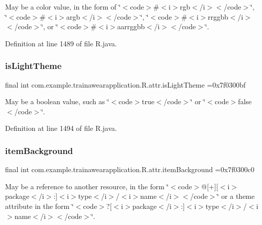May be a color value, in the form of \char`\"{}$<$code$>$\#$<$i$>$rgb$<$/i$>$$<$/code$>$\char`\"{}, \char`\"{}$<$code$>$\#$<$i$>$argb$<$/i$>$$<$/code$>$\char`\"{}, \char`\"{}$<$code$>$\#$<$i$>$rrggbb$<$/i$>$$<$/code$>$\char`\"{}, or \char`\"{}$<$code$>$\#$<$i$>$aarrggbb$<$/i$>$$<$/code$>$\char`\"{}. 

Definition at line 1489 of file R.\+java.

\mbox{\label{classcom_1_1example_1_1trainawearapplication_1_1_r_1_1attr_a0022e702c6ffefa6c69963eed311437e}} 
\subsubsection{\texorpdfstring{isLightTheme}{isLightTheme}}
{\footnotesize\ttfamily final int com.\+example.\+trainawearapplication.\+R.\+attr.\+is\+Light\+Theme =0x7f0300bf\hspace{0.3cm}{\ttfamily [static]}}

May be a boolean value, such as \char`\"{}$<$code$>$true$<$/code$>$\char`\"{} or \char`\"{}$<$code$>$false$<$/code$>$\char`\"{}. 

Definition at line 1494 of file R.\+java.

\mbox{\label{classcom_1_1example_1_1trainawearapplication_1_1_r_1_1attr_ab1cb963f996615386ef9951786344a9b}} 
\subsubsection{\texorpdfstring{itemBackground}{itemBackground}}
{\footnotesize\ttfamily final int com.\+example.\+trainawearapplication.\+R.\+attr.\+item\+Background =0x7f0300c0\hspace{0.3cm}{\ttfamily [static]}}

May be a reference to another resource, in the form \char`\"{}$<$code$>$@\mbox{[}+\mbox{]}\mbox{[}$<$i$>$package$<$/i$>$\+:\mbox{]}$<$i$>$type$<$/i$>$/$<$i$>$name$<$/i$>$$<$/code$>$\char`\"{} or a theme attribute in the form \char`\"{}$<$code$>$?\mbox{[}$<$i$>$package$<$/i$>$\+:\mbox{]}$<$i$>$type$<$/i$>$/$<$i$>$name$<$/i$>$$<$/code$>$\char`\"{}. 

